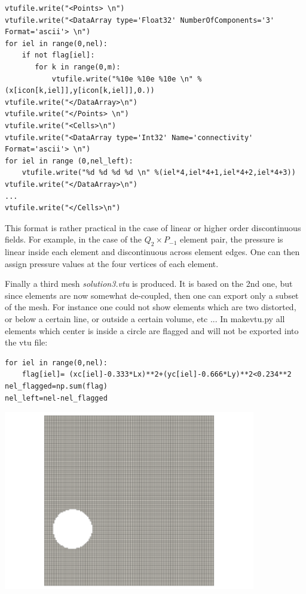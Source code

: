 \begin{lstlisting}
vtufile.write("<Points> \n")
vtufile.write("<DataArray type='Float32' NumberOfComponents='3' Format='ascii'> \n")
for iel in range(0,nel):
    if not flag[iel]:
       for k in range(0,m):
           vtufile.write("%10e %10e %10e \n" %(x[icon[k,iel]],y[icon[k,iel]],0.))
vtufile.write("</DataArray>\n")
vtufile.write("</Points> \n")
vtufile.write("<Cells>\n")
vtufile.write("<DataArray type='Int32' Name='connectivity' Format='ascii'> \n")
for iel in range (0,nel_left):
    vtufile.write("%d %d %d %d \n" %(iel*4,iel*4+1,iel*4+2,iel*4+3))
vtufile.write("</DataArray>\n")
...
vtufile.write("</Cells>\n")
\end{lstlisting}

This format is rather practical in the case of linear or higher order discontinuous fields. For example, in the case of the $Q_2\times P_{-1}$ element pair, the pressure is linear inside each element and discontinuous across element edges. One can then assign pressure values at the four vertices of each element.

Finally a third mesh {\sl solution3.vtu} is produced. It is based on the 2nd one, but since elements are now somewhat de-coupled, then one can export only a subset of the mesh. For instance one could not show elements which are two distorted, or below a certain line, or outside a certain volume, etc ... In {\pythonfile makevtu.py} all elements which center is inside a circle are flagged and will not be exported into the vtu file:
\begin{lstlisting}
for iel in range(0,nel):
    flag[iel]= (xc[iel]-0.333*Lx)**2+(yc[iel]-0.666*Ly)**2<0.234**2
nel_flagged=np.sum(flag)
nel_left=nel-nel_flagged
\end{lstlisting}

\begin{center}
\includegraphics[width=11cm]{images/vtk/mesh3}
\end{center}





